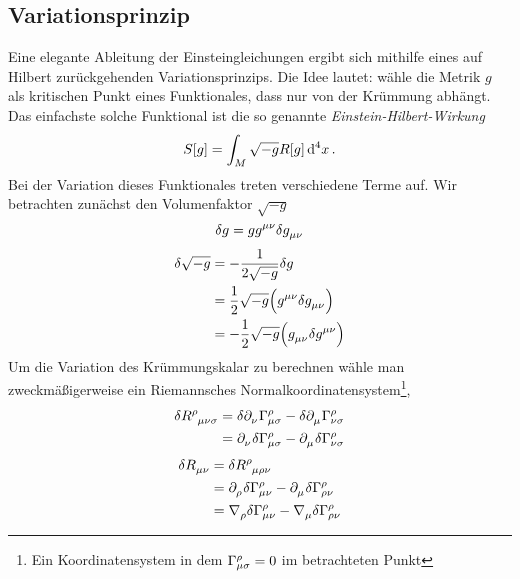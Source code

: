 \subsection{Variationsprinzip}
Eine elegante Ableitung der Einsteingleichungen ergibt sich mithilfe eines auf
Hilbert zurückgehenden Variationsprinzips. 
Die Idee lautet: wähle die Metrik $g$ als kritischen
Punkt eines Funktionales, dass nur von der Krümmung abhängt. Das
einfachste solche Funktional ist die so genannte
\emph{Einstein-Hilbert-Wirkung}
\begin{equation}
S[g]=\int_{M}\sqrt{-g}R[g] \dif{}^4x \,.
\end{equation}
Bei der Variation dieses Funktionales treten verschiedene Terme auf. Wir
betrachten zunächst den Volumenfaktor $\sqrt{-g}$
\begin{equation}
\delta g = g  \tensor{g}{^\mu^\nu}\delta\tensor{g}{_\mu_\nu}
\end{equation}
\begin{equation}
\begin{split}
\delta \sqrt{-g} 
&= -\frac{1}{2\sqrt{-g}}\delta g \\
&= \frac{1}{2} \sqrt{-g} \left(\tensor{g}{^\mu^\nu} \delta
\tensor{g}{_\mu_\nu}\right)\\
&= -\frac{1}{2} \sqrt{-g} \left(\tensor{g}{_\mu_\nu} \delta
\tensor{g}{^\mu^\nu}\right)
\end{split}
\end{equation}
Um die Variation des Krümmungskalar zu berechnen wähle man zweckmäßigerweise
ein Riemannsches Normalkoordinatensystem\footnote{Ein Koordinatensystem in dem
$\cSym{\rho}{\mu}{\sigma}=0$ im betrachteten Punkt},
\begin{equation}
\begin{split}
\delta \tensor{R}{^\rho_\mu_\nu_\sigma}
&=\delta \tensor{\partial}{_\nu}\cSym{\rho}{\mu}{\sigma}
-\delta \tensor{\partial}{_\mu}\cSym{\rho}{\nu}{\sigma}\\
&=\tensor{\partial}{_\nu}\delta \cSym{\rho}{\mu}{\sigma}
-\tensor{\partial}{_\mu}\delta \cSym{\rho}{\nu}{\sigma}\\
\end{split}
\end{equation}
\begin{equation}
\begin{split}
\delta \tensor{R}{_\mu_\nu}
&=\delta \tensor{R}{^\rho_\mu_\rho_\nu}\\
&=\tensor{\partial}{_\rho}\delta \cSym{\rho}{\mu}{\nu}
-\tensor{\partial}{_\mu}\delta \cSym{\rho}{\rho}{\nu}\\
&=\tensor{\nabla}{_\rho}\delta \cSym{\rho}{\mu}{\nu}
-\tensor{\nabla}{_\mu}\delta \cSym{\rho}{\rho}{\nu}\\
\end{split}
\end{equation}
